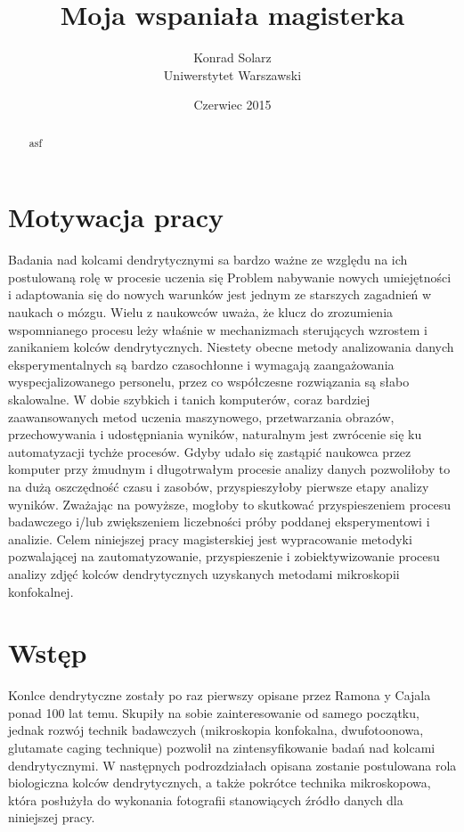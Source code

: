 \documentclass{article}
\begin{document}
\title{Moja wspaniała magisterka}
\author{Konrad Solarz\\Uniwerstytet Warszawski}
\date{Czerwiec 2015}
\maketitle
\clearpage
\begin{abstract}
asf

\end{abstract}
\clearpage

\tableofcontents
\clearpage

\section{Motywacja pracy}
Badania nad kolcami dendrytycznymi sa bardzo ważne ze względu na ich postulowaną rolę w procesie uczenia się %
Problem nabywanie nowych umiejętności i adaptowania się do nowych warunków jest jednym ze starszych zagadnień w naukach o mózgu.
Wielu z naukowców uważa, że klucz do zrozumienia wspomnianego procesu leży właśnie w mechanizmach sterujących wzrostem i zanikaniem kolców dendrytycznych.
Niestety obecne metody analizowania danych eksperymentalnych są bardzo czasochłonne i wymagają zaangażowania wyspecjalizowanego personelu, przez co współczesne rozwiązania są słabo skalowalne.
W dobie szybkich i tanich komputerów, coraz bardziej zaawansowanych metod uczenia maszynowego, przetwarzania obrazów, przechowywania i udostępniania wyników, naturalnym jest zwrócenie się ku automatyzacji tychże procesów.
Gdyby udało się zastąpić naukowca przez komputer przy żmudnym i długotrwałym procesie analizy danych pozwoliłoby to na dużą oszczędność czasu i zasobów, przyspieszyłoby pierwsze etapy analizy wyników.
Zważając na powyższe, mogłoby to skutkować przyspieszeniem procesu badawczego i/lub zwiększeniem liczebności próby poddanej eksperymentowi i analizie.
Celem niniejszej pracy magisterskiej jest wypracowanie metodyki pozwalającej na zautomatyzowanie, przyspieszenie i zobiektywizowanie procesu analizy zdjęć kolców dendrytycznych uzyskanych metodami mikroskopii konfokalnej.



\section{Wstęp}
Konlce dendrytyczne zostały po raz pierwszy opisane przez Ramona y Cajala ponad 100 lat temu. %
Skupiły na sobie zainteresowanie od samego początku, jednak rozwój technik badawczych (mikroskopia konfokalna, dwufotoonowa,
glutamate caging technique) %
pozwolił na zintensyfikowanie badań nad kolcami dendrytycznymi. W następnych podrozdziałach opisana zostanie postulowana rola
biologiczna kolców dendrytycznych, a także pokrótce technika mikroskopowa, która posłużyła do wykonania fotografii stanowiących źródło danych dla niniejszej pracy. 
    
\end{document}
